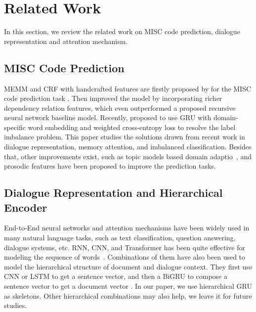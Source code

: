 \section{Related Work}
\label{sec:sentential:related}
In this section, we review the related work on MISC code prediction,
dialogue representation and attention mechanism.

\subsection{MISC Code Prediction}
\label{ssec:sentential:misc-related}

MEMM and CRF with handcrafted features are firstly proposed by
\citet{can2012case, can2015dialog} for the MISC code prediction task
. Then \citet{tanana2015recursive} improved the model by incorporating
richer dependency relation features, which even outperformed a
proposed recursive neural network baseline model. Recently,
\cite{xiao2016behavioral} proposed to use GRU with domain-specific word
embedding and weighted cross-entropy loss to resolve the label
imbalance problem. This paper studies the solutions drawn from
recent work in dialogue representation, memory attention, and
imbalanced classification. Besides that, other improvements exist,
such as topic models based domain adaptio~\cite{atkins2014scaling,
  huang2018modeling}, and prosodic features \cite{weber2002using} have
been proposed to improve the prediction tasks.

\subsection{Dialogue Representation and Hierarchical Encoder }
\label{ssec:sentential:dialogue-encoder}

End-to-End neural networks and attention mechanisms have been widely
used in many natural language tasks, such as text classification,
question answering, dialogue systems, etc.  RNN, CNN, and
Transformer has been quite effective for modeling the sequence of
words~\cite{ kim14cnn,zhang2015character}. Combinations of them have
also been used to model the hierarchical structure of document and
dialogue context. They first use CNN or LSTM to get a sentence vector,
and then a BiGRU to compose a sentence vector to get a document
vector \citep{tang2015document, li2015hierarchical,
  yang2016hierarchical,sordoni2015hierarchical, serban2016building,
  serban2017multiresolution}. In our paper, we use hierarchical GRU as
skeletons. Other hierarchical combinations may also help, we leave it
for future studies.

